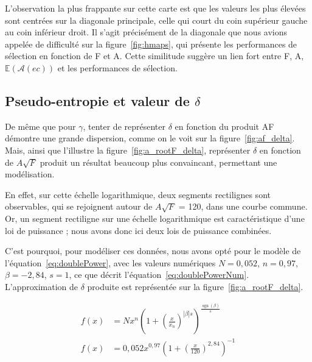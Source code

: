 	L'observation la plus frappante sur cette carte est que les valeurs les plus élevées sont centrées sur la diagonale principale, celle qui court du coin supérieur gauche au coin inférieur droit. Il s'agit précisément de la diagonale que nous avions appelée \og de difficulté \fg{} sur la figure~\ref{fig:hmaps}, qui présente les performances de sélection en fonction de F et A. Cette similitude suggère un lien fort entre F, A, $\mathbb{E}(\mathcal{A}(ec))$ et les performances de sélection.
	
	\subsection{Pseudo-entropie et valeur de \texorpdfstring{$\delta$}{delta}}
	
	De même que pour $\gamma$, tenter de représenter $\delta$ en fonction du produit AF démontre une grande dispersion, comme on le voit sur la figure~\ref{fig:af_delta}. Mais, ainsi que l'illustre la figure~\ref{fig:a_rootF_delta}, représenter $\delta$ en fonction de $A\sqrt{F}$ produit un résultat beaucoup plus convaincant, permettant une modélisation.
	
	En effet, sur cette échelle logarithmique, deux segments rectilignes sont observables, qui se rejoignent autour de $A\sqrt{F}$ = 120, dans une courbe commune. Or, un segment rectiligne sur une échelle logarithmique est caractéristique d'une loi de puissance ; nous avons donc ici deux lois de puissance combinées.
	
	C'est pourquoi, pour modéliser ces données, nous avons opté pour le modèle de l'équation~\ref{eq:doublePower}, avec les valeurs numériques $N = 0,052$, $n = 0,97$, $\beta{} = -2,84$, $s = 1$,  ce que décrit l'équation~\ref{eq:doublePowerNum}. L'approximation de $\delta$ produite est représentée sur la figure~\ref{fig:a_rootF_delta}.
	
	\begin{align}
		\label{eq:doublePower}
		f(x) &= N x^n \left(1+\left(\frac{x}{x_n}\right)^{|\beta|s}\right)^{\frac{\operatorname{sgn}(\beta)}{s}} \\
		\label{eq:doublePowerNum}
		f(x) &= 0,052 x^{0,97} \left(1+\left(\frac{x}{120}\right)^{2,84}\right)^{-1}
	\end{align}
	
